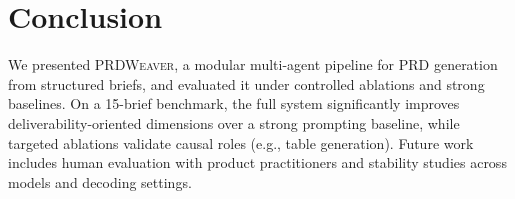 \section{Conclusion}
\label{sec:conclusion}

We presented \textsc{PRDWeaver}, a modular multi-agent pipeline for PRD generation from structured briefs, and evaluated it under controlled ablations and strong baselines.
On a 15-brief benchmark, the full system significantly improves deliverability-oriented dimensions over a strong prompting baseline, while targeted ablations validate causal roles (e.g., table generation).
Future work includes human evaluation with product practitioners and stability studies across models and decoding settings.


